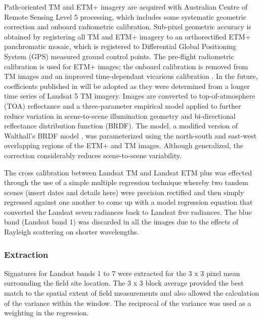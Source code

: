 \documentclass[remotesensing,article,accept,moreauthors,pdftex,12pt,a4paper]{mdpi}
\begin{document}
Path-oriented TM and ETM+ imagery are acquired with Australian Centre of Remote Sensing Level 5 processing, which includes some systematic geometric correction and onboard radiometric calibration. Sub-pixel geometric accuracy is obtained by registering all TM and ETM+ imagery to an orthorectified ETM+ panchromatic mosaic, which is registered to Differential Global Positioning System (GPS) measured ground control points. The pre-flight radiometric calibration is used for ETM+ images; the onboard calibration is removed from TM images and an improved time-dependant vicarious calibration \citep{Vries2007}. In the future, coefficients published in \citep{Chander2009} will be adopted as they were determined from a longer time series of Landsat 5 TM imagery. Images are converted to top-of-atmosphere (TOA) reflectance and a three-parameter empirical model applied to further reduce variation in scene-to-scene illumination geometry and bi-directional reflectance distribution function (BRDF). The model, a modified version of Walthall\textquoteright{}s BRDF model \citep{Walthall1985}, was parameterized using the north-south and east-west overlapping regions of the ETM+ and TM images. Although generalized, the correction considerably reduces scene-to-scene variability.
%
%

The cross calibration between Landsat TM and Landsat ETM plus was effected through the use of a simple multiple regression technique whereby two tandem scenes (insert dates and details here) were precision rectified and then simply regressed against one another to come up with a model regression equation that converted the Landsat seven radiances back to Landsat five radiances. The blue band (Landsat band 1) was discarded in all the images due to the effects of Rayleigh scattering on shorter wavelengths. 

\subsubsection{Extraction }

Signatures for Landsat bands 1 to 7 were extracted for the 3 x 3 pixel mean surrounding the field site location. The 3 x 3 block average provided the best match to the spatial extent of field measurements and also allowed the calculation of the variance within the window. The reciprocal of the variance was used as a weighting in the regression.
\end{document}
